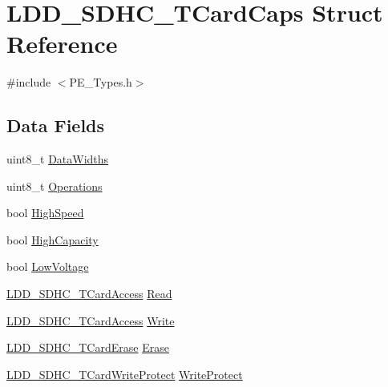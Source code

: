 \hypertarget{struct_l_d_d___s_d_h_c___t_card_caps}{\section{L\-D\-D\-\_\-\-S\-D\-H\-C\-\_\-\-T\-Card\-Caps Struct Reference}
\label{struct_l_d_d___s_d_h_c___t_card_caps}
}


{\ttfamily \#include $<$P\-E\-\_\-\-Types.\-h$>$}

\subsection*{Data Fields}
\begin{DoxyCompactItemize}
\item 
uint8\-\_\-t \hyperlink{struct_l_d_d___s_d_h_c___t_card_caps_a79fc1f5a77986075f37dfc967fc7e839}{Data\-Widths}
\item 
uint8\-\_\-t \hyperlink{struct_l_d_d___s_d_h_c___t_card_caps_a4af30c5df5445720a0da2f6abdcc9629}{Operations}
\item 
bool \hyperlink{struct_l_d_d___s_d_h_c___t_card_caps_a382fb9e854ee58ba00f5e390345dad9c}{High\-Speed}
\item 
bool \hyperlink{struct_l_d_d___s_d_h_c___t_card_caps_aecde13a16eb437017641776270f9479c}{High\-Capacity}
\item 
bool \hyperlink{struct_l_d_d___s_d_h_c___t_card_caps_a283a376bda2540641d83cde61d1e0188}{Low\-Voltage}
\item 
\hyperlink{struct_l_d_d___s_d_h_c___t_card_access}{L\-D\-D\-\_\-\-S\-D\-H\-C\-\_\-\-T\-Card\-Access} \hyperlink{struct_l_d_d___s_d_h_c___t_card_caps_ae5a39842e7b8c28f9246d3fc1b9a8f54}{Read}
\item 
\hyperlink{struct_l_d_d___s_d_h_c___t_card_access}{L\-D\-D\-\_\-\-S\-D\-H\-C\-\_\-\-T\-Card\-Access} \hyperlink{struct_l_d_d___s_d_h_c___t_card_caps_ad28c378a6b9edfbd726a8019d5c8be79}{Write}
\item 
\hyperlink{struct_l_d_d___s_d_h_c___t_card_erase}{L\-D\-D\-\_\-\-S\-D\-H\-C\-\_\-\-T\-Card\-Erase} \hyperlink{struct_l_d_d___s_d_h_c___t_card_caps_afc5bbe5bce7267f930d6e8501ac5d2ea}{Erase}
\item 
\hyperlink{struct_l_d_d___s_d_h_c___t_card_write_protect}{L\-D\-D\-\_\-\-S\-D\-H\-C\-\_\-\-T\-Card\-Write\-Protect} \hyperlink{struct_l_d_d___s_d_h_c___t_card_caps_a32ecbbace3b435b1d70a57b09bf9662b}{Write\-Protect}
\end{DoxyCompactItemize}


